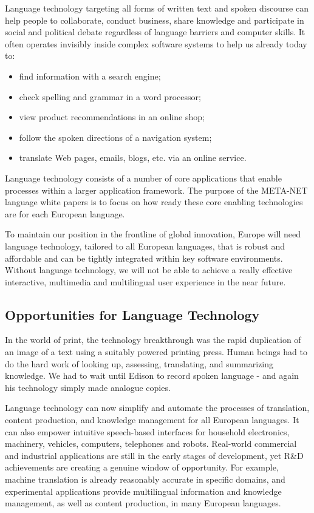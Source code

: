 \begin{multicols}{2}
Language technology targeting all forms of written text and spoken discourse can help people to collaborate, conduct business, share knowledge and participate in social and political debate regardless of language barriers and computer skills. It often operates invisibly inside complex software systems to help us already today to:

\begin{itemize}
\item find information with a search engine;
\item check spelling and grammar in a word processor;
\item view product recommendations in an online shop;
\item follow the spoken directions of a navigation system;
\item translate Web pages, emails, blogs, etc. via an online service.
\end{itemize}

Language technology consists of a number of core applications that enable processes within a larger application framework. The purpose of the META-NET language white papers is to focus on how ready these core enabling technologies are for each European language. 


To maintain our position in the frontline of global innovation, Europe will need language technology, tailored to all European languages, that is robust and affordable and can be tightly integrated within key software environments. Without language technology, we will not be able to achieve a really effective interactive, multimedia and multilingual user experience in the near future.

\subsection{Opportunities for Language Technology}

In the world of print, the technology breakthrough was the rapid duplication of an image of a text using a suitably powered printing press. Human beings had to do the hard work of looking up, assessing, translating, and summarizing knowledge. We had to wait until Edison to record spoken language - and again his technology simply made analogue copies.

Language technology can now simplify and automate the processes of translation, content production, and knowledge management for all European languages. It can also empower intuitive speech-based interfaces for household electronics, machinery, vehicles, computers, telephones and robots. Real-world commercial and industrial applications are still in the early stages of development, yet R\&D achievements are creating a genuine window of opportunity. For example, machine translation is already reasonably accurate in specific domains, and experimental applications provide multilingual information and knowledge management, as well as content production, in many European languages. 


\end{multicols}
